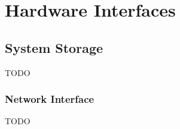\section{Hardware Interfaces} \label{sec:hardware_interfaces}


\subsection{System Storage}
TODO

\subsubsection{Network Interface}
TODO

